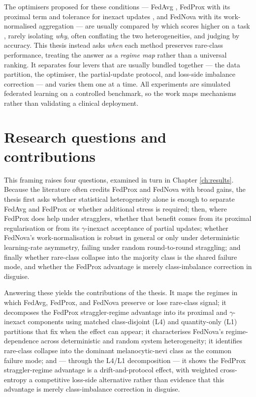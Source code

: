 \documentclass[11pt,a4paper]{report}
\begin{document}
The optimisers proposed for these conditions --- FedAvg \citep{mcmahan2017fedavg},
FedProx with its proximal term and tolerance for inexact updates
\citep{li2020fedprox}, and FedNova with its work-normalised aggregation
\citep{wang2020fednova} --- are usually compared by which scores higher on a task
\citep{li2022niidbench}, rarely isolating \emph{why}, often conflating the two
heterogeneities, and judging by accuracy. This thesis instead asks \emph{when}
each method preserves rare-class performance, treating the answer as a
\emph{regime map} rather than a universal ranking. It separates four levers that
are usually bundled together --- the data partition, the optimiser, the
partial-update protocol, and loss-side imbalance correction --- and varies them one
at a time. All experiments are simulated federated learning on a controlled
benchmark, so the work maps mechanisms rather than validating a clinical
deployment.

\section{Research questions and contributions}
\label{sec:intro-questions}

This framing raises four questions, examined in turn in
Chapter \ref{ch:results}. Because the literature often credits FedProx and
FedNova with broad gains, the thesis first asks whether statistical heterogeneity
alone is enough to separate FedAvg and FedProx or whether additional stress is
required; then, where FedProx does help under stragglers, whether that benefit
comes from its proximal regularisation or from its $\gamma$-inexact acceptance of
partial updates; whether FedNova's work-normalisation is robust in general or
only under deterministic learning-rate asymmetry, failing under random
round-to-round straggling; and finally whether rare-class collapse into the
majority class is the shared failure mode, and whether the FedProx advantage is
merely class-imbalance correction in disguise.

Answering these yields the contributions of the thesis. It maps the regimes in
which FedAvg, FedProx, and FedNova preserve or lose rare-class signal; it
decomposes the FedProx straggler-regime advantage into its proximal and
$\gamma$-inexact components using matched class-disjoint (L4) and quantity-only
(L1) partitions that fix when the effect can appear; it characterises FedNova's
regime-dependence across deterministic and random system heterogeneity; it
identifies rare-class collapse into the dominant melanocytic-nevi class as the
common failure mode; and --- through the L4/L1 decomposition --- it shows the
FedProx straggler-regime advantage is a drift-and-protocol effect, with weighted
cross-entropy a competitive loss-side alternative rather than evidence that this
advantage is merely class-imbalance correction in disguise.
\end{document}
